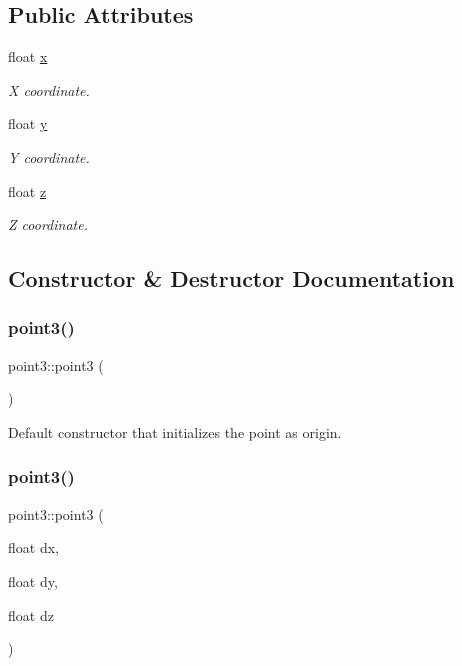 \subsection*{Public Attributes}
\begin{DoxyCompactItemize}
\item 
float \hyperlink{classpoint3_aea247c715872b7973d9cfc18b7143b90}{x}
\begin{DoxyCompactList}\small\item\em X coordinate. \end{DoxyCompactList}\item 
float \hyperlink{classpoint3_a55951af1fd6d03230ffde48142e5229b}{y}
\begin{DoxyCompactList}\small\item\em Y coordinate. \end{DoxyCompactList}\item 
float \hyperlink{classpoint3_a72b1c18f7a71ef3b4f2c57248870cde5}{z}
\begin{DoxyCompactList}\small\item\em Z coordinate. \end{DoxyCompactList}\end{DoxyCompactItemize}


\subsection{Constructor \& Destructor Documentation}
\hypertarget{classpoint3_a4305b1c6999df0099b3b9e68ef9e5ae3}{}\label{classpoint3_a4305b1c6999df0099b3b9e68ef9e5ae3} 
\subsubsection{\texorpdfstring{point3()}{point3()}\hspace{0.1cm}{\footnotesize\ttfamily [1/2]}}
{\footnotesize\ttfamily point3\+::point3 (\begin{DoxyParamCaption}{ }\end{DoxyParamCaption})}



Default constructor that initializes the point as origin. 

\hypertarget{classpoint3_ac4734d7f9ab13ab6fd9189c71d057db3}{}\label{classpoint3_ac4734d7f9ab13ab6fd9189c71d057db3} 
\subsubsection{\texorpdfstring{point3()}{point3()}\hspace{0.1cm}{\footnotesize\ttfamily [2/2]}}
{\footnotesize\ttfamily point3\+::point3 (\begin{DoxyParamCaption}\item[{float}]{dx,  }\item[{float}]{dy,  }\item[{float}]{dz }\end{DoxyParamCaption})}



